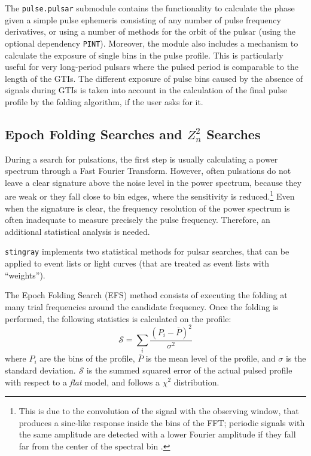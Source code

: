 \documentclass[twocolumn]{aastex62}
\newcommand{\zsq}{\ensuremath{Z^2_n}\xspace}
\newcommand{\stingray}{\texttt{stingray}\xspace}
\begin{document}
The \texttt{pulse.pulsar} submodule contains the functionality to calculate the phase given a simple pulse ephemeris consisting of any number of pulse frequency derivatives, or using a number of methods for the orbit of the pulsar (using the optional dependency \texttt{PINT}).
Moreover, the module also includes a mechanism to calculate the exposure of single bins in the pulse profile. 
This is particularly useful for very long-period pulsars where the pulsed period is comparable to the length of the GTIs.
The different exposure of pulse bins caused by the absence of signals during GTIs is taken into account in the calculation of the final pulse profile by the folding algorithm, if the user asks for it. 

\subsection{Epoch Folding Searches and \zsq Searches}
\label{sec:efzsq}
During a search for pulsations, the first step is usually calculating a power spectrum through a Fast Fourier Transform. 
However, often pulsations do not leave a clear signature above the noise level in the power spectrum, because they are weak or they fall close to bin edges, where the sensitivity is reduced.\footnote{This is due to the convolution of the signal with the observing window, that produces a sinc-like response inside the bins of the FFT; periodic signals with the same amplitude are detected with a lower Fourier amplitude if they fall far from the center of the spectral bin \citep{vanderklis1989}.}
Even when the signature is clear, the frequency resolution of the power spectrum is often inadequate to measure precisely the pulse frequency.
Therefore, an additional statistical analysis is needed. 

\stingray implements two statistical methods for pulsar searches, that can be applied to event lists or light curves (that are treated as event lists with ``weights'').

The Epoch Folding Search (EFS) method consists of executing the folding at many trial frequencies around the candidate frequency.
Once the folding is performed, the following statistics is calculated on the profile:
\begin{equation}
\mathcal{S} = \sum_i\frac{(P_i - \overline{P})^2}{\sigma^2}
\end{equation}
where $P_i$ are the bins of the profile, $\overline{P}$ is the mean level of the profile, and $\sigma$ is the standard deviation.
$\mathcal{S}$ is the summed squared error of the actual pulsed profile with respect to a \textit{flat} model, and follows a $\chi^2$ distribution.
\end{document}
